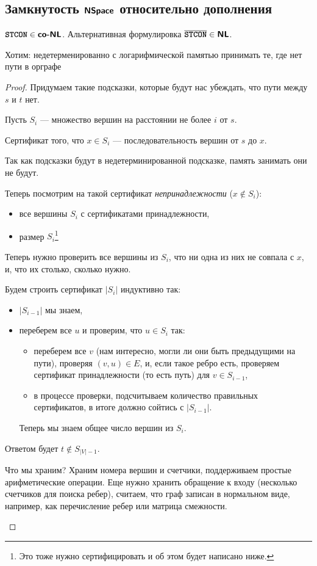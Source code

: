 \subsection{Замкнутость $\textmd{\textbf{\textsf{NSpace}}}$ относительно дополнения}
\begin{thm}
     $ {\textbf{\texttt{STCON}}} \in \textmd{\textbf{\textsf{co-NL}}}$. Альтернативная формулировка $ \overline{{\textbf{\texttt{STCON}}}} \in \textmd{\textbf{\textsf{NL}}}$. 
\end{thm}
    Хотим: недетерменированно с логарифмической памятью принимать те, где нет пути в орграфе
\begin{proof}
	Придумаем такие подсказки, которые будут нас убеждать, что пути между $ s$ и $ t$ нет.

	Пусть $ S_i$ --- множество вершин на расстоянии не более $ i$ от $ s$.

	Сертификат того, что $ x \in S_i$ --- последовательность вершин от $ s $ до $ x$.
	
	Так как подсказки будут в недетерминированной подсказке, память занимать они не будут.

	Теперь посмотрим на такой сертификат \textit{непринадлежности} ($ x \notin S_i$):
	\begin{itemize}
		\item все вершины  $ S_i$ с сертификатами принадлежности,
		\item размер $ S_i$\footnote{Это тоже нужно сертифицировать и об этом будет написано ниже.}
	\end{itemize}

	Теперь нужно проверить все вершины из $ S_i$, что ни одна из них не совпала с $ x$, и, что их столько, сколько нужно.

	Будем строить сертификат $ \lvert S_i \rvert $ индуктивно так:
	\begin{itemize}
		\item $ \lvert S_{i-1} \rvert $ мы знаем,
		\item переберем все $ u$ и проверим, что  $ u \in S_i$ так:
			\begin{itemize}[noitemsep]
				\item переберем все $ v $ (нам интересно, могли ли они быть предыдущими на пути), проверяя $ (v, u) \in E$, и, если такое ребро есть, проверяем сертификат принадлежности (то есть путь) для $ v \in S_{i-1}$,
				\item в процессе проверки, подсчитываем количество правильных сертификатов, в итоге должно сойтись с $ \lvert S_{i-1} \rvert $.
			\end{itemize}
			Теперь мы знаем общее число вершин из $ S_{i}$.
	\end{itemize}
	Ответом будет $t \notin S_{\lvert V \rvert - 1}$.
	\begin{note}
		Что мы храним? Храним номера вершин и счетчики, поддерживаем простые арифметические операции. Еще нужно хранить обращение к входу (несколько счетчиков для поиска ребер), считаем, что граф записан в нормальном виде, например, как перечисление ребер или матрица смежности.
	\end{note}
\end{proof}

